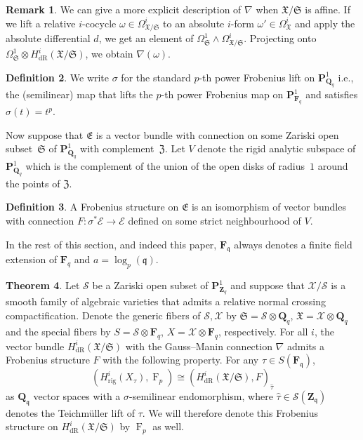 \documentclass[a4paper,11pt]{article}
\numberwithin{equation}{section}
\newcommand{\ZZ}{\mathbf{Z}} %
\newcommand{\QQ}{\mathbf{Q}} %
\newcommand{\FF}{\mathbf{F}} %
\DeclareMathOperator{\Frob}{F}           %
\providecommand{\HdR}{H_{\text{dR}}}    %
\providecommand{\Hrig}{H_{\text{rig}}}  %
\theoremstyle{definition}
\newtheorem{thm}{Theorem}[section]
\newtheorem{defn}[thm]{Definition}
\newtheorem{rem}[thm]{Remark}
\begin{document}
\begin{rem}
We can give a more explicit description of $\nabla$ when $\mathfrak{X}/\mathfrak{S}$ is affine. If we lift a 
relative $i$-cocycle $\omega \in \Omega^i_{\mathfrak{X}/\mathfrak{S}}$ to an absolute $i$-form 
$\omega' \in \Omega^i_{\mathfrak{X}}$ and apply the absolute differential $d$, we get an element of 
$\Omega^1_{\mathfrak{S}} \wedge \Omega^i_{\mathfrak{X}/\mathfrak{S}}$. Projecting onto 
$\Omega^1_{\mathfrak{S}} \otimes \HdR^i(\mathfrak{X}/\mathfrak{S})$, we obtain $\nabla(\omega)$. 
\end{rem}

\begin{defn}
We write $\sigma$ for the standard $p$-th power Frobenius lift on $\mathbf{P}^1_{\QQ_q}$ i.e., 
the (semilinear) map that lifts the $p$-th power Frobenius map on $\mathbf{P}^1_{\FF_q}$ and
satisfies $\sigma(t)=t^p$. 
\end{defn}

Now suppose that $\mathfrak{E}$ is a vector bundle with connection on 
some Zariski open subset~$\mathfrak{S}$ of $\mathbf{P}^1_{\QQ_q}$ with 
complement~$\mathfrak{Z}$. Let $V$ denote the rigid analytic subspace 
of $\mathbf{P}^1_{\QQ_q}$ which is the complement of the union of the 
open disks of radius~$1$ around the points of $\mathfrak{Z}$.

\begin{defn}
A Frobenius structure on $\mathfrak{E}$ is an isomorphism of vector bundles with connection 
$F:\sigma^* \mathcal{E} \rightarrow \mathcal{E}$ defined on some strict neighbourhood of $V$. 
\end{defn}

In the rest of this section, and indeed this paper, $\FF_{\mathfrak{q}}$ always
denotes a finite field extension of $\FF_q$ and $a=\log_p(\mathfrak{q})$.

\begin{thm} \label{thm:frobstruc}
Let $\mathcal{S}$ be a Zariski open subset of $\mathbf{P}^1_{\ZZ_q}$ and suppose that 
$\mathcal{X}/\mathcal{S}$ is a smooth family of algebraic varieties that admits a relative
normal crossing compactification. Denote the generic fibers of $\mathcal{S},\mathcal{X}$ by
$\mathfrak{S}=\mathcal{S} \otimes \QQ_q$, $\mathfrak{X}=\mathcal{X} \otimes \QQ_q$
and the special fibers by $S=\mathcal{S} \otimes \FF_q$, $X=\mathcal{X} \otimes \FF_q$, respectively.
For all $i$, the vector bundle $\HdR^i(\mathfrak{X}/\mathfrak{S})$ with the
Gauss--Manin connection $\nabla$ admits a Frobenius structure $F$ with the following property.
For any $\tau \in S(\FF_{\mathfrak{q}})$,
\[
(\Hrig^i(X_{\tau}),\Frob_p) \cong (\HdR^i(\mathfrak{X}/\mathfrak{S}),F)_{\hat{\tau}}
\] 
as $\QQ_{\mathfrak{q}}$ vector spaces with a $\sigma$-semilinear endomorphism, where 
$\hat{\tau} \in \mathcal{S}(\ZZ_{\mathfrak{q}})$ denotes the Teichm\"uller lift of $\tau$. 
We will therefore denote this Frobenius structure on $\HdR^i(\mathfrak{X}/\mathfrak{S})$ by $\Frob_p$ 
as well.
\end{thm}
\end{document}
